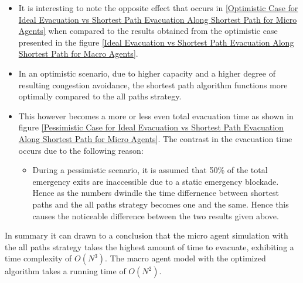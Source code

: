 \begin{itemize}
  \item It is interesting to note the opposite effect that occurs in \ref{Optimistic Case for Ideal Evacuation vs Shortest Path Evacuation Along Shortest Path for Micro Agents} when compared to the results obtained from the optimistic case presented in the figure \ref{Ideal Evacuation vs Shortest Path Evacuation Along Shortest Path for Macro Agents}.
  \item In an optimistic scenario, due to higher capacity and a higher degree of resulting congestion avoidance, the shortest path algorithm functions more optimally compared to the all paths strategy.
  \item This however becomes a more or less even total evacuation time as shown in figure \ref{Pessimistic Case for Ideal Evacuation vs Shortest Path Evacuation Along Shortest Path for Micro Agents}. The contrast in the evacuation time occurs due to the following reason:
    \begin{itemize}
      \item During a pessimistic scenario, it is assumed that 50\% of the total emergency exits are inaccessible due to a static emergency blockade. Hence as the numbers dwindle the time differnence between shortest paths and the all paths strategy becomes one and the same. Hence this causes the noticeable difference between the two results given above. 
    \end{itemize}
\end{itemize}

In summary it can drawn to a conclusion that the micro agent simulation with the all paths strategy takes the highest amount of time to evacuate, exhibiting a time complexity of $O(N^3)$. The macro agent model with the optimized algorithm takes a running time of $O(N^2)$.
